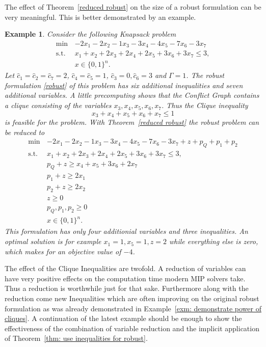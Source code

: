 \documentclass[titlepage, a4paper]{amsbook}
\theoremstyle{plain}
\theoremstyle{break}
\newtheorem{exm}[thm]{Example}
\theoremstyle{definition}
\theoremstyle{remark}
\numberwithin{equation}{thm}
\begin{document}
The effect of Theorem~\ref{reduced robust} on the size of a robust formulation can be very meaningful. This is better demonstrated by an example.
\begin{exm}\label{exm: variable reduction}
Consider the following Knapsack problem
\begin{equation*}
\begin{split}
    \min\, &-2x_1-2x_2-1x_3-3x_4-4x_5-7x_6-3x_7\\
    \text{s.t. } &x_1+x_2+2x_3+2x_4+2x_5+3x_6+3x_7 \leq 3, \\
    &x \in \{0,1\}^n.
\end{split}
\end{equation*}
Let $\hat{c}_1=\hat{c}_2=\hat{c}_7=2$, $\hat{c}_4=\hat{c}_5=1$, $\hat{c}_3=0, \hat{c}_6=3$ and $\Gamma=1$.
The robust formulation \eqref{robust} of this problem has six additional inequalities and seven additional variables.
A little precomputing shows that the Conflict Graph contains a clique consisting of the variables $x_3, x_4, x_5, x_6, x_7$. Thus the Clique inequality
\[x_3 + x_4+ x_5 + x_6 + x_7 \leq 1\]
is feasible for the problem. With Theorem~\ref{reduced robust} the robust problem can be reduced to
\begin{equation*}
\begin{split}
    \min\, &-2x_1-2x_2-1x_3-3x_4-4x_5-7x_6-3x_7 + z + p_Q + p_1 +p_2\\
    \text{s.t. } &x_1+x_2+2x_3+2x_4+2x_5+3x_6+3x_7 \leq 3, \\
    &p_Q + z \geq x_4 + x_5 + 3x_6+ 2x_7 \\
    &p_1 + z \geq 2x_1 \\
    &p_2 + z \geq 2x_2 \\
    &z \geq 0 \\
    &p_Q,p_1,p_2 \geq 0 \\
    &x \in \{0,1\}^n.
\end{split}
\end{equation*}
This formulation has only four additionial variables and three inequalities. An optimal solution is for example $x_1=1, x_5=1, z=2$ while everything else is zero, which makes for an objective value of $-4$.
\end{exm}
The effect of the Clique Inequalities are twofold. 
A reduction of variables can have very positive effects on the computation time modern MIP solvers take. Thus a reduction is worthwhile just for that sake. Furthermore along with the reduction come new Inequalities which are often improving on the original robust formulation as was already demonstrated in Example~\ref{exm: demonstrate power of cliques}. A continuation of the latest example should be enough to show the effectiveness of the combination of variable reduction and the implicit application of Theorem~\ref{thm: use inequalities for robust}.
\end{document}
